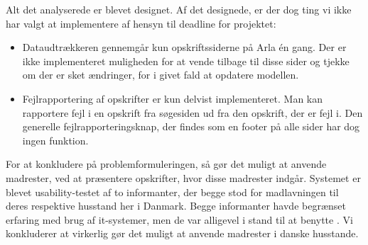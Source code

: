 Alt det analyserede er blevet designet. Af det designede, er der dog ting vi ikke har valgt at implementere af hensyn til deadline for projektet:
\begin{itemize}
\item Dataudtrækkeren gennemgår kun opskriftssiderne på Arla én gang. Der er ikke implementeret muligheden for at vende tilbage til disse sider og tjekke om der er sket ændringer, for i givet fald at opdatere modellen.
\item Fejlrapportering af opskrifter er kun delvist implementeret. Man kan rapportere fejl i en opskrift fra søgesiden ud fra den opskrift, der er fejl i. Den generelle fejlrapporteringsknap, der findes som en footer på alle sider har dog ingen funktion.
\end{itemize}

For at konkludere på problemformuleringen, så gør \Foodl{} det muligt at anvende madrester, ved at præsentere opskrifter, hvor disse madrester indgår. Systemet er blevet usability-testet af to informanter, der begge stod for madlavningen til deres respektive husstand her i Danmark. Begge informanter havde begrænset erfaring med brug af it-systemer, men de var alligevel i stand til at benytte \Foodl{}. Vi konkluderer at \Foodl{} virkerlig gør det muligt at anvende madrester i danske husstande.



